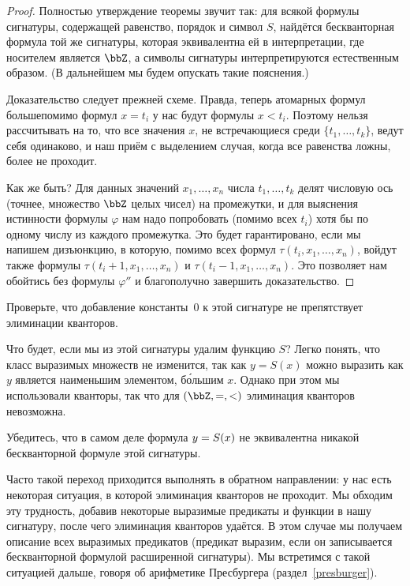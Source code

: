 \begin{proof}
Полностью утверждение теоремы звучит так: для всякой формулы
сигнатуры, содержащей равенство, порядок и символ $S$, найдётся
бескванторная формула той же сигнатуры, которая эквивалентна ей
в интерпретации, где носителем является $\bbZ$, а символы
сигнатуры интерпретируются естественным образом. (В дальнейшем
мы будем опускать такие пояснения.)

Доказательство следует прежней схеме. Правда, теперь атомарных
формул больше\т помимо формул $x=t_i$ у нас будут формулы
$x<t_i$. Поэтому нельзя рассчитывать на то, что все значения
$x$, не встречающиеся среди $\{t_1,\dots,t_k\}$, ведут себя
одинаково, и наш приём с выделением случая, когда все равенства
ложны, более не проходит.

Как же быть? Для данных значений $x_1,\dots,x_n$ числа
$t_1,\dots,t_k$ делят числовую ось (точнее, множество $\bbZ$
целых чисел) на промежутки, и для выяснения истинности формулы
$\varphi$ нам надо попробовать (помимо всех $t_i$) хотя бы по
одному числу из каждого промежутка. Это будет гарантировано,
если мы напишем дизъюнкцию, в которую, помимо всех формул
$\tau(t_i,x_1,\dots,x_n)$, войдут также формулы
$\tau(t_i+1,x_1,\dots,x_n)$ и $\tau(t_i-1,x_1,\dots,x_n)$. Это
позволяет нам обойтись без формулы $\varphi''$ и благополучно
завершить доказательство.
\end{proof}

\begin{problem}
Проверьте, что добавление константы~$0$ к этой сигнатуре
не препятствует элиминации кванторов.
\end{problem}

Что будет, если мы из этой сигнатуры удалим функцию $S$? Легко
понять, что класс выразимых множеств не изменится, так как
$y=S(x)$ можно выразить как  $y$ является наименьшим
элементом, б\'ольшим $x$. Однако при этом мы использовали
кванторы, так что для $(\bbZ,{=},{<})$ элиминация
кванторов невозможна.

\begin{problem}
Убедитесь, что  в самом деле формула $y\hm=S(x)$ не
эквивалентна никакой бескванторной формуле этой сигнатуры.
\end{problem}

Часто такой переход приходится выполнять в обратном направлении:
у нас есть некоторая ситуация, в которой элиминация кванторов не
проходит. Мы обходим эту трудность, добавив некоторые
выразимые предикаты и функции в нашу сигнатуру, после чего
элиминация кванторов удаётся. В этом случае мы получаем описание
всех выразимых предикатов (предикат выразим, если он
записывается бескванторной формулой расширенной сигнатуры). Мы
встретимся с такой ситуацией дальше, говоря об арифметике
Пресбургера%
%
(раздел~\ref{presburger}).

